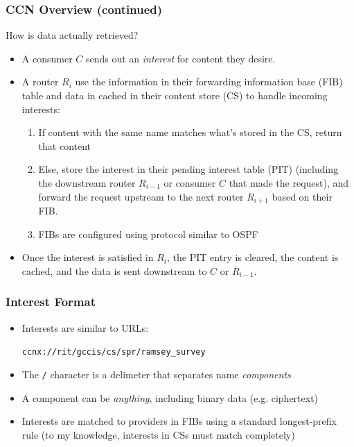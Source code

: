 \documentclass[handout]{beamer}
\begin{document}
\begin{frame}
	\frametitle{CCN Overview (continued)}
	How is data actually retrieved? 
	\begin{itemize}
		\item A consumer $C$ sends out an \emph{interest} for content they desire.
		\item A router $R_i$ use the information in their forwarding information base (FIB) table and data in cached in their content store (CS) to handle incoming interests:
		\begin{enumerate}
			\item If content with the same name matches what's stored in the CS, return that content
			\item Else, store the interest in their pending interest table (PIT) (including the downstream router $R_{i-1}$ or consumer $C$ that made the request), and forward the request upstream to the next router $R_{i+1}$ based on their FIB.
			\item FIBs are configured using protocol similar to OSPF
		\end{enumerate}
		\item Once the interest is satisfied in $R_i$, the PIT entry is cleared, the content is cached, and the data is sent downstream to $C$ or $R_{i-1}$. 
 	\end{itemize}
\end{frame}

\begin{frame}
	\frametitle{Interest Format}
	\begin{itemize}
		\item Interests are similar to URLs: 
		\begin{center}
			{\tt ccnx://rit/gccis/cs/spr/ramsey\_survey}
		\end{center}
		\item The {\tt /} character is a delimeter that separates name \emph{components}
		\item A component can be \emph{anything}, including binary data (e.g. ciphertext)
		\item Interests are matched to providers in FIBs using a standard longest-prefix rule (to my knowledge, interests in CSs must match completely)
	\end{itemize}
\end{frame}
\end{document}

